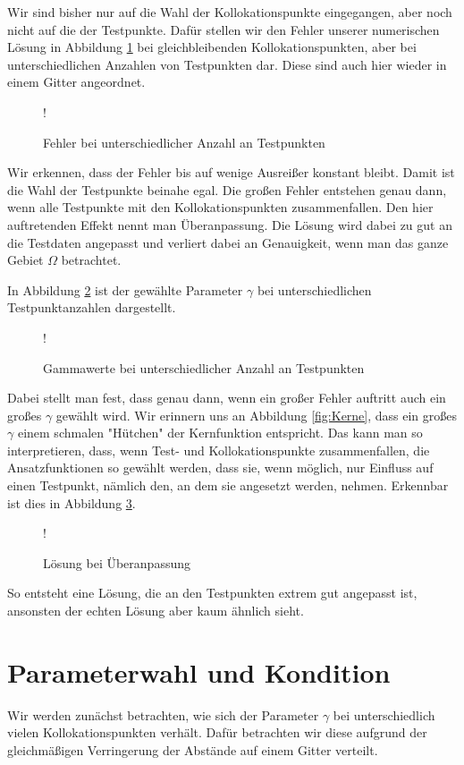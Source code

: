 Wir sind bisher nur auf die Wahl der Kollokationspunkte eingegangen, aber noch nicht auf die der Testpunkte. Dafür stellen wir den Fehler unserer numerischen Lösung in Abbildung \ref{fig:testpunkte} bei gleichbleibenden Kollokationspunkten, aber bei unterschiedlichen Anzahlen von Testpunkten dar. Diese sind auch hier wieder in einem Gitter angeordnet.
\begin{figure}[H]
\centering
\resizebox {\columnwidth} {!} {

}
\caption{Fehler bei unterschiedlicher Anzahl an Testpunkten}
\label{fig:testpunkte}
\end{figure}
Wir erkennen, dass der Fehler bis auf wenige Ausreißer konstant bleibt. Damit ist die Wahl der Testpunkte beinahe egal. Die großen Fehler entstehen genau dann, wenn alle Testpunkte mit den Kollokationspunkten zusammenfallen. Den hier auftretenden Effekt nennt man Überanpassung. Die Lösung wird dabei zu gut an die Testdaten angepasst und verliert dabei an Genauigkeit, wenn man das ganze Gebiet $\Omega$ betrachtet. 

In Abbildung \ref{fig:testpunkte-gamma} ist der gewählte Parameter $\gamma$ bei unterschiedlichen Testpunktanzahlen dargestellt.
\begin{figure}[ht]
\centering
\resizebox {\columnwidth} {!} {

}
\caption{Gammawerte bei unterschiedlicher Anzahl an Testpunkten}
\label{fig:testpunkte-gamma}
\end{figure}
Dabei stellt man fest, dass genau dann, wenn ein großer Fehler auftritt auch ein großes $\gamma$ gewählt wird. Wir erinnern uns an Abbildung \ref{fig:Kerne}, dass ein großes $\gamma$ einem schmalen "Hütchen" der Kernfunktion entspricht. Das kann man so interpretieren, dass, wenn Test- und Kollokationspunkte zusammenfallen, die Ansatzfunktionen so gewählt werden, dass sie, wenn möglich, nur Einfluss auf einen Testpunkt, nämlich den, an dem sie angesetzt werden, nehmen. Erkennbar ist dies in Abbildung \ref{fig:overfitting}.
\begin{figure}[ht]
\centering
\resizebox {\columnwidth} {!} {

}
\caption{Lösung bei Überanpassung}
\label{fig:overfitting}
\end{figure}

So entsteht eine Lösung, die an den Testpunkten extrem gut angepasst ist, ansonsten der echten Lösung aber kaum ähnlich sieht.

\section{Parameterwahl und Kondition}
Wir werden zunächst betrachten, wie sich der Parameter $\gamma$ bei unterschiedlich vielen Kollokationspunkten verhält. Dafür betrachten wir diese aufgrund der gleichmäßigen Verringerung der Abstände auf einem Gitter verteilt. 

